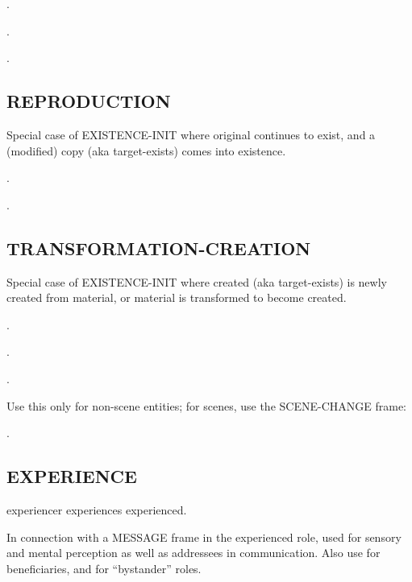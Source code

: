 \documentclass[a4paper]{article}
\newcommand{\fr}[1]{\textsf{#1}}
\newcommand{\rl}[1]{\textsf{#1}}
\begin{document}
\ex.

\ex.

\ex.


\newpage\subsection{ \fr{REPRODUCTION}}
\label{sec:REPRODUCTION}

Special case of \fr{EXISTENCE-INIT} where \rl{original} continues to exist, and
a (modified) \rl{copy} (aka \rl{target-exists}) comes into existence.

\ex.

\ex.


\newpage\subsection{ \fr{TRANSFORMATION-CREATION}}
\label{sec:TRANSFORMATION-CREATION}

Special case of \fr{EXISTENCE-INIT} where \rl{created} (aka \rl{target-exists})
is newly created from \rl{material}, or \rl{material} is transformed to become
\rl{created}.

\ex.

\ex.

\ex.

Use this only for non-scene entities; for scenes, use the \fr{SCENE-CHANGE}
frame:

\ex.


\newpage\subsection{ \fr{EXPERIENCE}}
\label{sec:EXPERIENCE}

\rl{experiencer} experiences \rl{experienced}.

In connection with a \fr{MESSAGE} frame in the \rl{experienced} role, used for
sensory and mental perception as well as addressees in communication. Also use
for beneficiaries, and for ``bystander'' roles.
\end{document}
